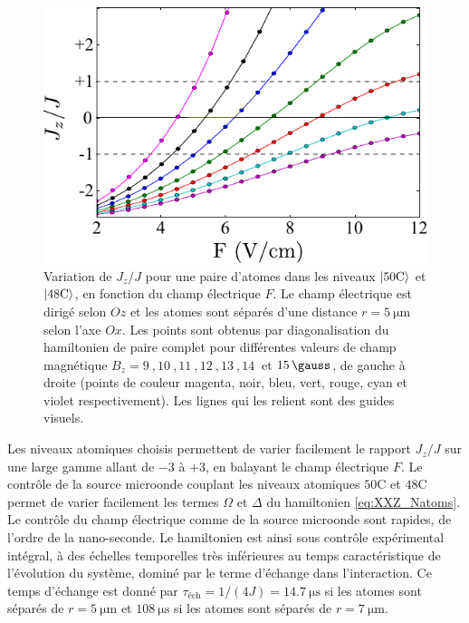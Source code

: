 %
\begin{figure}[!h]
\centering
\includegraphics[width=0.7\linewidth]{figures/circsim/Jz_Jscan}
\caption[Variation de $J_z/J$]{
Variation de $J_z/J$ pour une paire d'atomes dans les niveaux $\ket{\mathrm{50C}}$ et $\ket{\mathrm{48C}}$, en fonction du champ électrique $F$.
Le champ électrique est dirigé selon $Oz$ et les atomes sont séparés d'une distance $r=\SI{5}{\um}$ selon l'axe $Ox$.
Les points sont obtenus par diagonalisation du hamiltonien de paire complet pour différentes valeurs de champ magnétique $B_z=\SI{9}{},\SI{10}{},\SI{11}{},\SI{12}{},\SI{13}{},\SI{14}{}$ et $\SI{15}{\gauss}$, de gauche à droite (points de couleur magenta, noir, bleu, vert, rouge, cyan et violet respectivement).
Les lignes qui les relient sont des guides visuels.
}
\label{fig:Jz_Jscan}
\end{figure}
%

Les niveaux atomiques choisis permettent de varier facilement le rapport $J_z/J$ sur une large gamme allant de $-3$ à $+3$, en balayant le champ électrique $F$.
Le contrôle de la source microonde couplant les niveaux atomiques $\mathrm{50C}$ et $\mathrm{48C}$ permet de varier facilement les termes $\Omega$ et $\Delta$ du hamiltonien \eqref{eq:XXZ_Natoms}.
Le contrôle du champ électrique comme de la source microonde sont rapides, de l'ordre de la nano-seconde.
Le hamiltonien est ainsi sous contrôle expérimental intégral, à des échelles temporelles très inférieures au temps caractéristique de l'évolution du système, dominé par le terme d'échange dans l'interaction.
Ce temps d'échange est donné par $\tau_{\text{\'ech}} = 1/(4J) = \SI{14.7}{\us}$ si les atomes sont séparés de $r=\SI{5}{\um}$ et $\SI{108}{\us}$ si les atomes sont séparés de $r=\SI{7}{\um}$.


